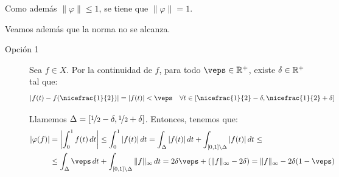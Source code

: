 \begin{ejercicio}
Como además $\|\varphi\| \leq 1$, se tiene que $\|\varphi\| = 1$.

Veamos además que la norma no se alcanza.
\begin{description}
    \item[Opción 1] Sea $f \in X$. Por la continuidad de $f$, para todo $\veps \in \bb{R}^+$, existe $\delta \in \mathbb{R}^+$ tal que:
    \begin{equation*}
        |f(t) - f(\nicefrac{1}{2})| = |f(t)| < \veps \quad \forall t \in \left[\nicefrac{1}{2} - \delta, \nicefrac{1}{2} + \delta\right]
    \end{equation*}

    Llamemos $\Delta=\left[\nicefrac{1}{2} - \delta, \nicefrac{1}{2} + \delta\right]$. Entonces, tenemos que:
    \begin{align*}
        |\varphi(f)| &= \left|\int_{0}^1 f(t)\,dt\right| \leq \int_{0}^1 |f(t)|\,dt = \int_{\Delta} |f(t)|\,dt + \int_{[0, 1]\setminus \Delta} |f(t)|\,dt \leq \\ &\leq \int_{\Delta} \veps\,dt + \int_{[0, 1]\setminus \Delta} \|f\|_\infty\,dt = 2\delta \veps + (\|f\|_\infty - 2\delta) = \|f\|_\infty - 2\delta(1 - \veps)
    \end{align*}


\end{description}
\end{ejercicio}
